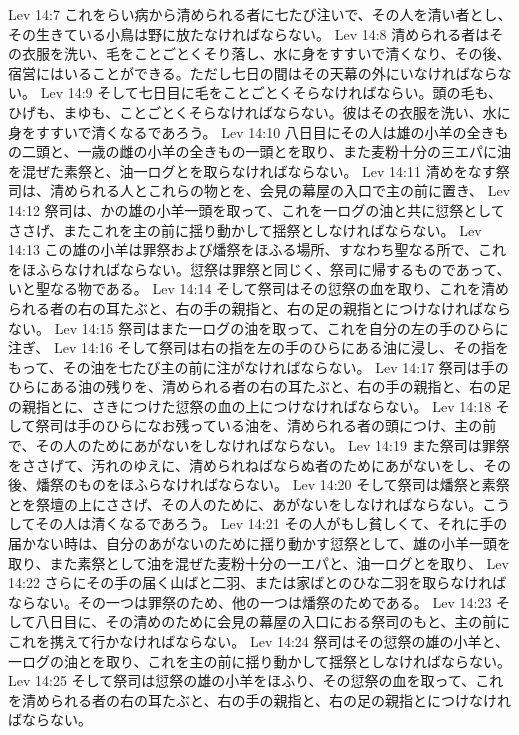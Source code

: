 Lev 14:7  これをらい病から清められる者に七たび注いで、その人を清い者とし、その生きている小鳥は野に放たなければならない。
Lev 14:8  清められる者はその衣服を洗い、毛をことごとくそり落し、水に身をすすいで清くなり、その後、宿営にはいることができる。ただし七日の間はその天幕の外にいなければならない。
Lev 14:9  そして七日目に毛をことごとくそらなければならい。頭の毛も、ひげも、まゆも、ことごとくそらなければならない。彼はその衣服を洗い、水に身をすすいで清くなるであろう。
Lev 14:10  八日目にその人は雄の小羊の全きもの二頭と、一歳の雌の小羊の全きもの一頭とを取り、また麦粉十分の三エパに油を混ぜた素祭と、油一ログとを取らなければならない。
Lev 14:11  清めをなす祭司は、清められる人とこれらの物とを、会見の幕屋の入口で主の前に置き、
Lev 14:12  祭司は、かの雄の小羊一頭を取って、これを一ログの油と共に愆祭としてささげ、またこれを主の前に揺り動かして揺祭としなければならない。
Lev 14:13  この雄の小羊は罪祭および燔祭をほふる場所、すなわち聖なる所で、これをほふらなければならない。愆祭は罪祭と同じく、祭司に帰するものであって、いと聖なる物である。
Lev 14:14  そして祭司はその愆祭の血を取り、これを清められる者の右の耳たぶと、右の手の親指と、右の足の親指とにつけなければならない。
Lev 14:15  祭司はまた一ログの油を取って、これを自分の左の手のひらに注ぎ、
Lev 14:16  そして祭司は右の指を左の手のひらにある油に浸し、その指をもって、その油を七たび主の前に注がなければならない。
Lev 14:17  祭司は手のひらにある油の残りを、清められる者の右の耳たぶと、右の手の親指と、右の足の親指とに、さきにつけた愆祭の血の上につけなければならない。
Lev 14:18  そして祭司は手のひらになお残っている油を、清められる者の頭につけ、主の前で、その人のためにあがないをしなければならない。
Lev 14:19  また祭司は罪祭をささげて、汚れのゆえに、清められねばならぬ者のためにあがないをし、その後、燔祭のものをほふらなければならない。
Lev 14:20  そして祭司は燔祭と素祭とを祭壇の上にささげ、その人のために、あがないをしなければならない。こうしてその人は清くなるであろう。
Lev 14:21  その人がもし貧しくて、それに手の届かない時は、自分のあがないのために揺り動かす愆祭として、雄の小羊一頭を取り、また素祭として油を混ぜた麦粉十分の一エパと、油一ログとを取り、
Lev 14:22  さらにその手の届く山ばと二羽、または家ばとのひな二羽を取らなければならない。その一つは罪祭のため、他の一つは燔祭のためである。
Lev 14:23  そして八日目に、その清めのために会見の幕屋の入口におる祭司のもと、主の前にこれを携えて行かなければならない。
Lev 14:24  祭司はその愆祭の雄の小羊と、一ログの油とを取り、これを主の前に揺り動かして揺祭としなければならない。
Lev 14:25  そして祭司は愆祭の雄の小羊をほふり、その愆祭の血を取って、これを清められる者の右の耳たぶと、右の手の親指と、右の足の親指とにつけなければならない。

